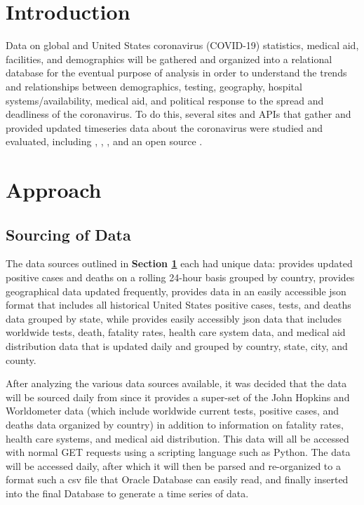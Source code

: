 \documentclass[11pt]{article}
\newcommand{\MYhref}[3][blue]{\href{#2}{\color{#1}{#3}}}%
\begin{document}
\pagebreak

\section{Introduction}
\label{sec:Intro}
\noindent
Data on global and United States coronavirus (COVID-19) statistics, medical aid, facilities, and demographics will be gathered and organized into a relational database for the eventual purpose of analysis in order to understand the trends and relationships between demographics, testing, geography, hospital systems/availability, medical aid, and political response to the spread and deadliness of the coronavirus. To do this, several sites and APIs that gather and provided updated timeseries data about the coronavirus were studied and evaluated, including \MYhref{https://www.worldometers.info/coronavirus/}{Worldometer}, \MYhref{https://coronavirus.jhu.edu/map.html}{John Hopkins Coronavirus Resource Center}, \MYhref{https://covidtracking.com/api}{The Covid Tracking Project}, and an open source \MYhref{https://www.npmjs.com/package/covid19-api}{Covid-19 API}.

\section{Approach}

\subsection{Sourcing of Data}
\label{subsec:sourcedata}

\noindent
The data sources outlined in \textbf{Section \ref{sec:Intro}} each had unique data: \MYhref{https://www.worldometers.info/coronavirus/}{Worldometer} provides updated positive cases and deaths on a rolling 24-hour basis grouped by country, \MYhref{https://coronavirus.jhu.edu/map.html}{John Hopkins Coronavirus Resource Center} provides geographical data updated frequently, \MYhref{https://covidtracking.com/api}{The Covid Tracking Project} provides data in an easily accessible json format that includes all historical United States positive cases, tests, and deaths data grouped by state, while \MYhref{https://www.npmjs.com/package/covid19-api}{Covid-19 API} provides easily accessibly json data that includes worldwide tests, death, fatality rates, health care system data, and medical aid distribution data that is updated daily and grouped by country, state, city, and county.

\noindent
After analyzing the various data sources available, it was decided that the data will be sourced daily from \MYhref{https://www.npmjs.com/package/covid19-api}{Covid-19 API} since it provides a super-set of the John Hopkins and Worldometer data (which include worldwide current tests, positive cases, and deaths data organized by country) in addition to information on fatality rates, health care systems, and medical aid distribution. This data will all be accessed with normal GET requests using a scripting language such as Python. The data will be accessed daily, after which it will then be parsed and re-organized to a format such a csv file that Oracle Database can easily read, and finally inserted into the final Database to generate a time series of data.
\end{document}
